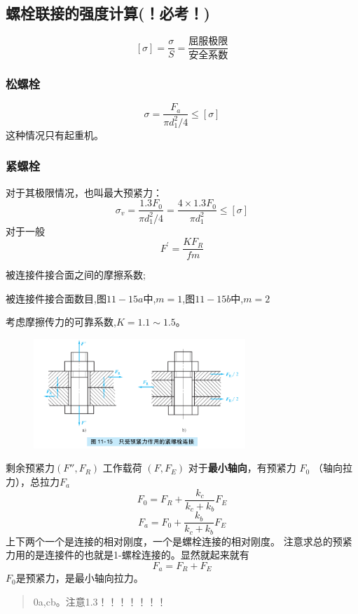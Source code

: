 \documentclass[twocolumn]{ctexart}
\begin{document}
\subsection{螺栓联接的强度计算(！必考！)}
$$
[\sigma]=\frac{\sigma}{S}=\frac{\text{屈服极限}}{\text{安全系数}}
$$
\subsubsection{松螺栓}
$$
\sigma = \frac{F_{a}}{\pi d_{1}^{2}/4}\leq \left[ \sigma \right]
$$
这种情况只有起重机。
\subsubsection{紧螺栓}
对于其极限情况，也叫最大预紧力：
$$  \sigma _{v}= \frac{1.3F_0}{\pi d_{1}^{2}/4}= \frac{4 \times 1.3F_0}{\pi d_{1}^{2}}\leq \left[ \sigma \right] $$
对于一般
$$ F^{\prime}= \frac{KF_{R}}{fm} $$
\begin{description}[leftmargin=0.7cm,style=nextline,nosep]%
  \item[f] 被连接件接合面之间的摩擦系数;
  \item[m] 被连接件接合面数目,图$ 11-15a $中,$ m=1 $,图$ 11-15b $中,$ m=2 $
  \item[K] 考虑摩擦传力的可靠系数,$ K=1.1 \sim 1.5 $。
   
\end{description}
        \begin{figure}[H]
            \centering
            \includegraphics[width=8cm]{img/8.png}
            \end{figure}
剩余预紧力$(F'',F_R)$ 工作载荷 $(F,F_E)$
对于\textbf{最小轴向}，有预紧力 $F_0$ （轴向拉力），总拉力$F_a$
$$ F_0=F_R+ \frac{k_{c}}{k_{c}+k_{b}}F_E $$
$$ F_a=F_0+ \frac{k_{b}}{k_{c}+k_{b}}F_E $$
上下两个一个是连接的相对刚度，一个是螺栓连接的相对刚度。
注意求总的预紧力用的是连接件的也就是1-螺栓连接的。显然就起来就有
$$
F_a =F_R+F_E
$$
$F_0$是预紧力，是最小轴向拉力。
\begin{quote}
{\qquad{}\ccwd\kaishu{}
0a,cb。注意1.3！！！！！！！
}
\end{quote}
\end{document}
